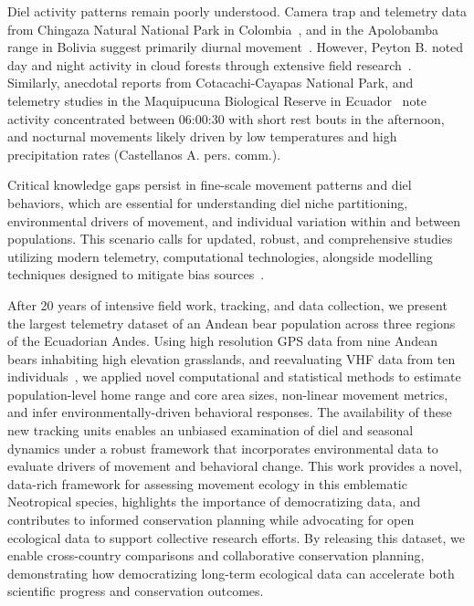 \documentclass[lineno,referee,pdflatex,sn-vancouver-num]{sn-jnl}%
\theoremstyle{thmstyleone}%
\theoremstyle{thmstyletwo}%
\theoremstyle{thmstylethree}%
\begin{document}
Diel activity patterns remain poorly understood. Camera trap and telemetry data from Chingaza Natural National Park in Colombia~\cite{parra-romeroNotEatingAlone2019}, and in the Apolobamba range in Bolivia suggest primarily diurnal movement~\cite{paisleyActivityPatternsTime2005}. However, Peyton B. noted day and night activity in cloud forests through extensive field research~\cite{peytonSpectacledBearConservation}. Similarly, anecdotal reports from Cotacachi-Cayapas National Park, and telemetry studies in the Maquipucuna Biological Reserve in Ecuador~\cite{castellanosEcologiaComportamientoOsos2005} note activity concentrated between 06:00:30 with short rest bouts in the afternoon, and nocturnal movements likely driven by low temperatures and high precipitation rates (Castellanos A. pers. comm.).

Critical knowledge gaps persist in fine-scale movement patterns and diel behaviors, which are essential for understanding diel niche partitioning, environmental drivers of movement, and individual variation within and between populations. This scenario calls for updated, robust, and comprehensive studies utilizing modern telemetry, computational technologies, alongside modelling techniques designed to mitigate bias sources~\cite{silvaAutocorrelationinformedHomeRange2022}.

After 20 years of intensive field work, tracking, and data collection, we present the largest telemetry dataset of an Andean bear population across three regions of the Ecuadorian Andes. Using high resolution GPS data from nine Andean bears inhabiting high elevation grasslands, and reevaluating VHF data from ten individuals~\cite{castellanosAndeanBearHome2011}, we applied novel computational and statistical methods to estimate population-level home range and core area sizes, non-linear movement metrics, and infer environmentally-driven behavioral responses. The availability of these new tracking units enables an unbiased examination of diel and seasonal dynamics under a robust framework that incorporates environmental data to evaluate drivers of movement and behavioral change. This work provides a novel, data-rich framework for assessing movement ecology in this emblematic Neotropical species, highlights the importance of democratizing data, and contributes to informed conservation planning while advocating for open ecological data to support collective research efforts.
By releasing this dataset, we enable cross-country comparisons and collaborative conservation planning, demonstrating how democratizing long-term ecological data can accelerate both scientific progress and conservation outcomes.
\end{document}
